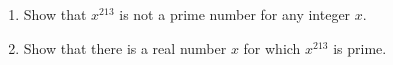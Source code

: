 \begin{enumerate}
\item[(a)] Show that $x^{213}$ is not a prime number for any integer $x$.
\item[(b)] Show that there is a real number $x$ for which $x^{213}$ is prime.
\end{enumerate}
